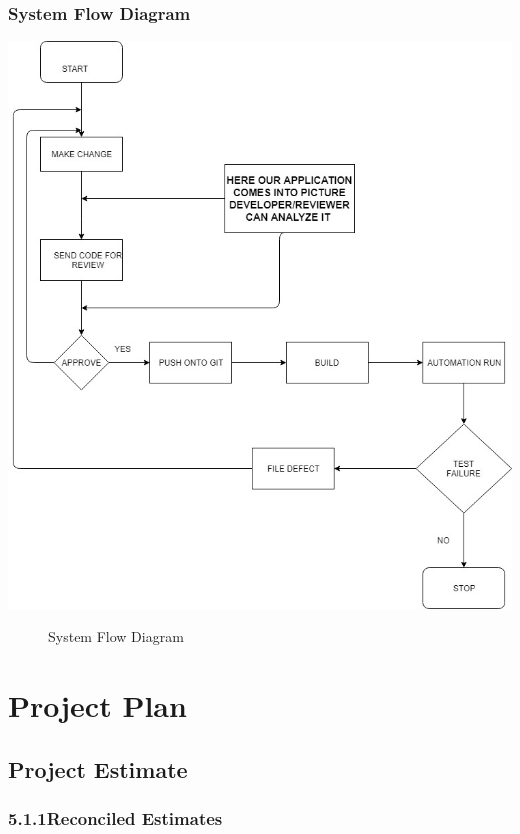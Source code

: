 \documentclass[oneside,a4paper,12pt]{book}
\begin{document}
\subsection{System Flow Diagram}
\vspace*{1\baselineskip}
\includegraphics[width=\textwidth]{flow.png}
\begin{figure}[h]
    \caption{System Flow Diagram}
    \label{fig:System Flow Diagram}
\end{figure}




\chapter{Project Plan}

\section{Project Estimate}

\subsection*{5.1.1\hspace*{10pt}Reconciled Estimates}
\end{document}
